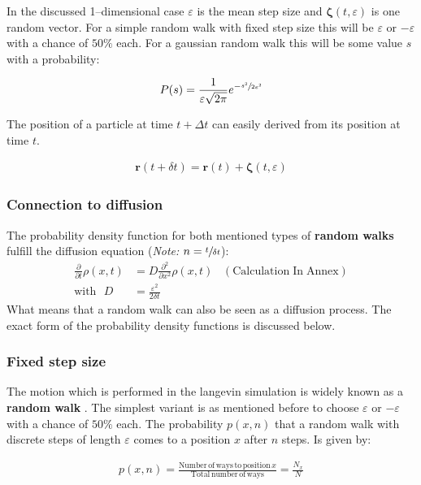 \documentclass[a4paper, parskip=half]{scrartcl}
\newcommand{\effect}[1]{%
	\textbf{#1}%
}
\newcommand{\myEqLabel}[1]{\label{eq:#1}}
\newcommand{\myEqAnnex}[1]{\;\;\;\mathrm{(Calculation\;In\;Annex)} \myEqLabel{#1}}
\begin{document}
In the discussed 1--dimensional case $\varepsilon$ is the mean step size and $\boldsymbol{\zeta}(t, \varepsilon)$ is one random vector. For a simple random walk with fixed step size this will be $\varepsilon$ or $-\varepsilon$ with a chance of $50\%$ each. For a gaussian random walk this will be some value $s$ with a probability:

\begin{align}
P(s) = \frac{1}{\varepsilon \sqrt{2\pi}} e^{-\sfrac{s^2}{2\varepsilon^2}}
\end{align} 

The position of a particle at time $t + \Delta t$ can easily derived from its position at time $t$.

\begin{align}
\mathbf{r}(t + \delta t) = \mathbf{r}(t) + \boldsymbol{\zeta}(t, \varepsilon)
\end{align}

\subsubsection{Connection to diffusion}
The probability density function for both mentioned types of \effect{random walks} fulfill the diffusion equation (\textit{Note: }$n = \sfrac{t}{\delta t}$):
\begin{align}
\frac{\partial}{\partial t} \rho(x,t) &= D \frac{\partial^2}{\partial x^2 } \rho(x,t) \myEqAnnex{diffusion_PDE} \\
\mathrm{with} \, \, \,\, D &= \frac{\varepsilon^2}{2 \delta t} \myEqLabel{def:D}
\end{align}
What means that a random walk can also be seen as a diffusion process. The exact form of the probability density functions is discussed below.
\subsubsection{Fixed step size}
The motion which is performed in the langevin simulation is widely known as a \effect{random walk}. The simplest variant is as mentioned before to choose $\varepsilon$ or $-\varepsilon$ with a chance of $50\%$ each. The probability $p(x, n)$ that a random walk with discrete steps of length $\varepsilon$ comes to a position $x$ after $n$ steps. Is given by:

\begin{align}
p(x, n) = \frac{\mathrm{Number\, of\, ways\, to\, position\,} x}{\mathrm{Total\, number\, of\, ways}} = \frac{N_x}{N}
\end{align}
\end{document}
